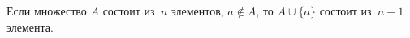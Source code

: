 
Если множество $A$ состоит из~$n$  элементов, $a\nin A$, то $A\cup \{a\}$ состоит из~$n+1$ элемента.
